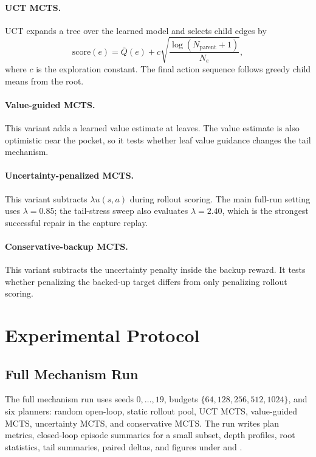 \documentclass{article}
\begin{document}
\paragraph{UCT MCTS.}
UCT expands a tree over the learned model and selects child edges by
\[
\mathrm{score}(e)=\bar Q(e)+c\sqrt{\frac{\log(N_{\mathrm{parent}}+1)}{N_e}},
\]
where \(c\) is the exploration constant. The final action sequence follows greedy child means from the root.

\paragraph{Value-guided MCTS.}
This variant adds a learned value estimate at leaves. The value estimate is also optimistic near the pocket, so it tests whether leaf value guidance changes the tail mechanism.

\paragraph{Uncertainty-penalized MCTS.}
This variant subtracts \(\lambda u(s,a)\) during rollout scoring. The main full-run setting uses \(\lambda=0.85\); the tail-stress sweep also evaluates \(\lambda=2.40\), which is the strongest successful repair in the capture replay.

\paragraph{Conservative-backup MCTS.}
This variant subtracts the uncertainty penalty inside the backup reward. It tests whether penalizing the backed-up target differs from only penalizing rollout scoring.

\section{Experimental Protocol}

\subsection{Full Mechanism Run}

The full mechanism run uses seeds \(0,\ldots,19\), budgets \(\{64,128,256,512,1024\}\), and six planners: random open-loop, static rollout pool, UCT MCTS, value-guided MCTS, uncertainty MCTS, and conservative MCTS. The run writes plan metrics, closed-loop episode summaries for a small subset, depth profiles, root statistics, tail summaries, paired deltas, and figures under  and .
\end{document}
